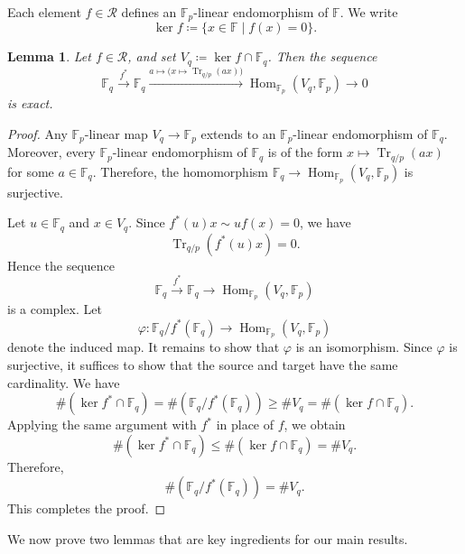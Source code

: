 \documentclass[12pt,a4paper]{amsart}
\newtheorem{lemma}[theorem]{Lemma}
\theoremstyle{definition}
\def\F{{\mathbb F}}
\newcommand{\mc}{\mathcal}
\theoremstyle{remark}
\DeclareMathOperator{\Hom}{Hom}
\DeclareMathOperator{\Tr}{Tr}
\begin{document}
Each element $f\in\mc R$ defines an $\F_p$-linear endomorphism of $\F$. We write 
\[
\ker f\coloneqq \{x\in\F\mid f(x)=0\}. 
\]
\begin{lemma}\label{exact}
Let $f\in\mc R$, and set $V_q\coloneqq\ker f\cap\F_q$. 
Then the sequence 
\[
\F_q\xrightarrow{f^\ast}\F_q\xrightarrow{
a\mapsto \bigl(x\mapsto \Tr_{q/p}(ax)\bigr)} \Hom_{\F_p}(V_q,\F_p)\to0 
\]
is exact. 
\end{lemma}
\begin{proof}
Any $\F_p$-linear map $V_q \to \F_p$ extends to 
an $\F_p$-linear endomorphism of $\F_q$. Moreover, every $\F_p$-linear endomorphism of $\F_q$ is of  the 
form $x \mapsto \Tr_{q/p}(ax)$ for some $a \in \F_q$. Therefore, 
the homomorphism $\F_q\to \Hom_{\F_p}(V_q,\F_p)$ is surjective. 

Let $u \in \F_q$ and $x\in V_q$. Since $f^\ast(u)x\sim uf(x)=0$, 
we have  
\[\Tr_{q/p}(f^\ast(u) x)=0.\]
Hence the sequence 
\[
\F_q\overset{f^\ast}{\to}\F_q\to\Hom_{\F_p}(V_q,\F_p)
\]
is a complex. Let 
\[
\varphi\colon \F_q/f^\ast(\F_q) \to \Hom_{\F_p}(V_q,\F_p)
\]
denote the induced map. 
It remains to show that $\varphi$ is an isomorphism. Since $\varphi$ is
surjective, it suffices to show that the source and target have the same
cardinality. We have 
\[
\#(\ker f^\ast\cap \F_q)=
\#(\F_q/f^\ast(\F_q))\ge \#V_q=\#(\ker f \cap \F_q). 
\]
Applying the same argument with $f^\ast$ in place of $f$, we obtain
 \[\#(\ker f^\ast\cap \F_q)\le \#(\ker f \cap \F_q)=\#V_q. \]
 Therefore, 
\[
\#(\F_q/f^\ast(\F_q))= \#V_q. 
\]
 This completes the proof. 
\end{proof}




We now prove two lemmas that are key ingredients for our main results. 
\end{document}
